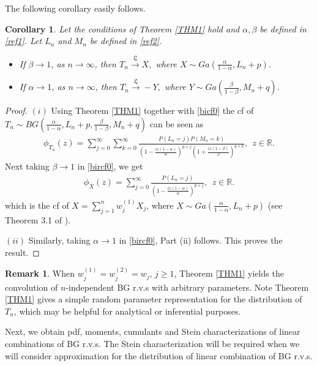 \documentclass[12pt, a4paper,reqno]{amsart}
\newtheorem{cor}[thm]{Corollary}
\theoremstyle{definition}
\theoremstyle{myremark}
\newtheorem{rem}[thm]{Remark}
\numberwithin{equation}{section}
\begin{document}
\noindent
The following corollary easily follows.
\vspace{-0.5cm}
\begin{cor}\label{LCgamma}
Let the conditions of Theorem \ref{THM1} hold and $\alpha,\beta$ be defined in \eqref{ref1}. Let $L_n$ and $M_n$ be defined in \eqref{ref2}.
\begin{itemize}
\item[(i)] If $\beta \to 1$, as $n\to \infty$, then $T_n \overset{\mathfrak{L}}{\to} X,$ where $X\sim Ga(\frac{\alpha}{1-\alpha},L_n+p).$

\item[(ii)] If $\alpha \to 1$, as $n\to \infty$, then $T_n \overset{\mathfrak{L}}{\to} -Y,$ where $Y\sim Ga(\frac{\beta}{1-\beta},M_n+q).$
\end{itemize}
\end{cor}
\begin{proof}
$(i)$ Using Theorem \ref{THM1} together with \eqref{bicf0} the cf of $T_n \sim BG (\frac{\alpha}{1-\alpha},L_n+p,\frac{\beta}{1-\beta}, M_n+q)$ can be seen as
\begin{align}\label{bircf0}
\phi_{T_n}(z)=\sum_{j=0}^{\infty}\sum_{k=0}^{\infty}\frac{P(L_n=j)P(M_n=k)}{\left(1 -
\frac{iz(1-\alpha)}{\alpha}\right)^{p+j} \left(1 +\frac{iz(1-\beta)}{\beta}\right)^{q+k}}, ~~z\in\mathbb{R}.
\end{align}
\noindent
Next taking $\beta \to 1$
in \eqref{bircf0}, we get
\begin{align}\label{bircf1}
\phi_X(z)=\sum_{j=0}^{\infty}\frac{P(L_n=j)}{\left(1 -\frac{iz(1-\alpha)}{\alpha}\right)^{p+j} }, ~~z\in\mathbb{R}.
\end{align}
 which is the cf of $X=\sum_{j=1}^{n}w_j^{(1)}X_j$, where $X\sim Ga(\frac{\alpha}{1-\alpha},L_n+p)$ (see Theorem 3.1 of \cite{pvns2009}).

\noindent
$(ii)$ Similarly, taking $\alpha \to 1$ in \eqref{bircf0}, Part (ii) follows.  This proves the result.
\end{proof}

\begin{rem}\label{rmkTn}
 When $w_j^{(1)}=w_j^{(2)}=w_j$, $j\geq 1$, Theorem \ref{THM1} yields the convolution of $n$-independent BG r.v.s with arbitrary parameters. Note Theorem \ref{THM1} gives a simple random parameter representation for the distribution of $T_n$, which may be helpful for analytical or inferential purposes. 
 \end{rem}
 \vspace{-0.5cm}
\noindent
Next, we obtain pdf, moments, cumulants and Stein characterizations of linear combinations of BG r.v.s. 
The Stein characterization will be required when we will consider approximation for the distribution of linear combination of BG r.v.s.
\end{document}
